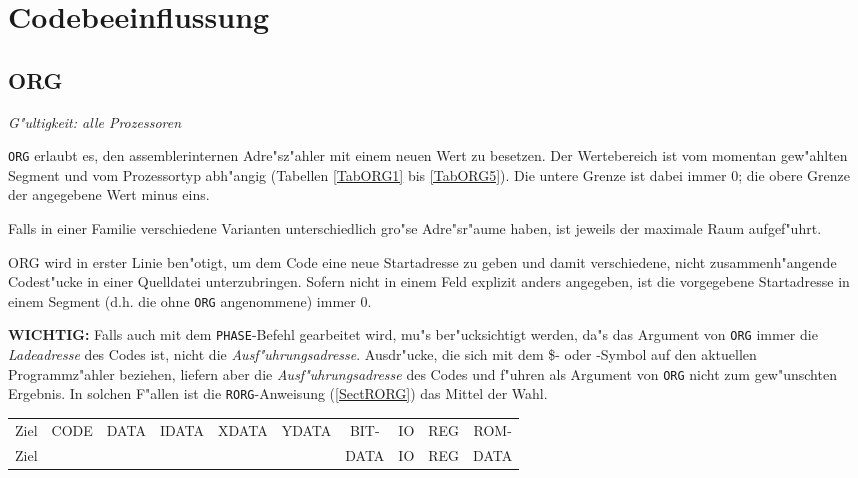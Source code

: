 \documentclass[12pt,a4paper,twoside]{report}
\makeatletter
\newcommand{\tty}[1]{{\tt #1}}
\newcommand{\tin}[1]{{\scriptsize #1}}
\newcommand{\ttindex}[1]{\index{#1@{\tt #1}}}
\makeatother
\begin{document}

\section{Codebeeinflussung}


\subsection{ORG}
\label{SectORG}\ttindex{ORG}

{\em G"ultigkeit: alle Prozessoren}

\tty{ORG} erlaubt es, den assemblerinternen Adre"sz"ahler mit einem neuen
Wert zu besetzen.  Der Wertebereich ist vom momentan gew"ahlten Segment
und vom Prozessortyp abh"angig (Tabellen \ref{TabORG1} bis \ref{TabORG5}).
Die untere Grenze ist dabei immer 0; die obere Grenze der angegebene Wert
minus eins.
\par
Falls in einer Familie verschiedene Varianten unterschiedlich
gro"se Adre"sr"aume haben, ist jeweils der maximale Raum aufgef"uhrt.
\par
ORG wird in erster Linie ben"otigt, um dem Code eine neue Startadresse
zu geben und damit verschiedene, nicht zusammenh"angende Codest"ucke in
einer Quelldatei unterzubringen.  Sofern nicht in einem Feld explizit anders
angegeben, ist die vorgegebene Startadresse in einem Segment (d.h. die ohne
{\tt ORG} angenommene) immer 0.
\par
{\bf WICHTIG:} Falls auch mit dem \tty{PHASE}-Befehl gearbeitet
wird, mu"s ber"ucksichtigt werden, da"s das Argument von \tty{ORG}
immer die {\em Ladeadresse} des Codes ist, nicht die {\em
Ausf"uhrungsadresse}.  Ausdr"ucke, die sich mit dem \$- oder
\*-Symbol auf den aktuellen Programmz"ahler beziehen, liefern
aber die {\em Ausf"uhrungsadresse} des Codes und f"uhren als
Argument von \tty{ORG} nicht zum gew"unschten Ergebnis.  In
solchen F"allen ist die \tty{RORG}-Anweisung (\ref{SectRORG}) das
Mittel der Wahl.
\begin{table*}[htbp]
\begin{center}\begin{tabular}{|l|c|c|c|c|c|c|c|c|c|}
\hline
\tin{Ziel} & \tin{CODE} & \tin{DATA} & \tin{IDATA} & \tin{XDATA} & \tin{YDATA} & \tin{BIT-} & \tin{IO} & \tin{REG} & \tin{ROM-} \\
\tin{Ziel} &            &            &             &             &             & \tin{DATA} & \tin{IO} & \tin{REG} & \tin{DATA} \\
\hline
\hline

\hline
\end{tabular}\end{center}
\caption{Adre"sbereiche f"ur \tty{ORG} --- Teil 1\label{TabORG1}}
\end{table*}
\end{document}
